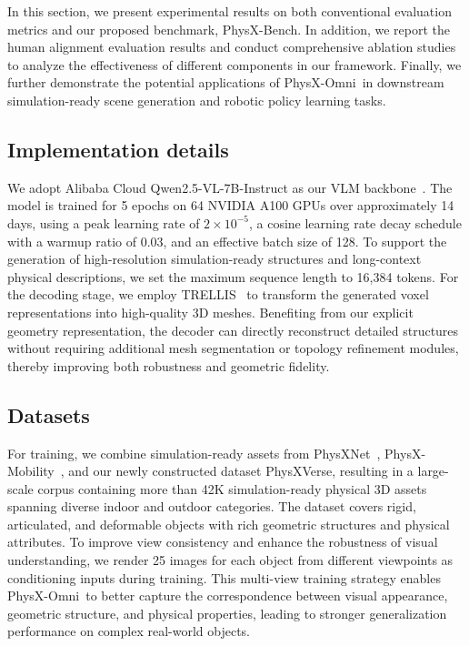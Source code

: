 \documentclass[11pt]{article}
\def\ourname{PhysX-Omni}
\def\ournewdata{PhysXVerse}
\def\ourbench{PhysX-Bench}
\begin{document}
In this section, we present experimental results on both conventional evaluation metrics and our proposed benchmark, \ourbench. In addition, we report the human alignment evaluation results and conduct comprehensive ablation studies to analyze the effectiveness of different components in our framework. Finally, we further demonstrate the potential applications of \ourname\ in downstream simulation-ready scene generation and robotic policy learning tasks.

\subsection{Implementation details}
We adopt Alibaba Cloud Qwen2.5-VL-7B-Instruct as our VLM backbone~\cite{bai2025qwen2}. The model is trained for 5 epochs on 64 NVIDIA A100 GPUs over approximately 14 days, using a peak learning rate of $2\times10^{-5}$, a cosine learning rate decay schedule with a warmup ratio of 0.03, and an effective batch size of 128. To support the generation of high-resolution simulation-ready structures and long-context physical descriptions, we set the maximum sequence length to 16,384 tokens. For the decoding stage, we employ TRELLIS~\cite{trellis} to transform the generated voxel representations into high-quality 3D meshes. Benefiting from our explicit geometry representation, the decoder can directly reconstruct detailed structures without requiring additional mesh segmentation or topology refinement modules, thereby improving both robustness and geometric fidelity. 

\subsection{Datasets}
For training, we combine simulation-ready assets from PhysXNet~\cite{cao2025physx}, PhysX-Mobility~\cite{cao2025physxanything}, and our newly constructed dataset \ournewdata, resulting in a large-scale corpus containing more than 42K simulation-ready physical 3D assets spanning diverse indoor and outdoor categories. The dataset covers rigid, articulated, and deformable objects with rich geometric structures and physical attributes. To improve view consistency and enhance the robustness of visual understanding, we render 25 images for each object from different viewpoints as conditioning inputs during training. This multi-view training strategy enables \ourname\ to better capture the correspondence between visual appearance, geometric structure, and physical properties, leading to stronger generalization performance on complex real-world objects.
\end{document}
